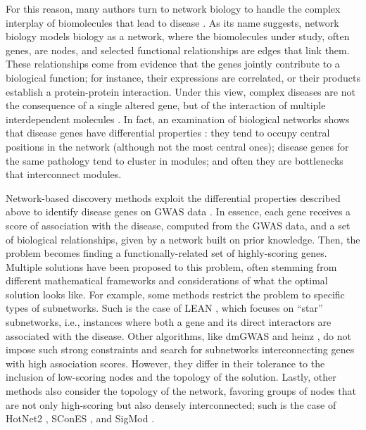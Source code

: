 \documentclass[10pt,letterpaper]{article}
\begin{document}
For this reason, many authors turn to network biology to handle the complex interplay of biomolecules that lead to disease \cite{furlong_human_2013,leisersonNetworkAnalysisGWAS2013}. As its name suggests, network biology models biology as a network, where the biomolecules under study, often genes, are nodes, and selected functional relationships are edges that link them. These relationships come from evidence that the genes jointly contribute to a biological function; for instance, their expressions are correlated, or their products establish a protein-protein interaction. Under this view, complex diseases are not the consequence of a single altered gene, but of the interaction of multiple interdependent molecules \cite{barabasi_network_2011}. In fact, an examination of biological networks shows that disease genes have differential properties \cite{barabasi_network_2011,cai_broker_2010}: they tend to occupy central positions in the network (although not the most central ones); disease genes for the same pathology tend to cluster in modules; and often they are bottlenecks that interconnect modules.

Network-based discovery methods exploit the differential properties described above to identify disease genes on GWAS data \cite{azencott_network-guided_2016,huang_systematic_2018}. In essence, each gene receives a score of association with the disease, computed from the GWAS data, and a set of biological relationships, given by a network built on prior knowledge. Then, the problem becomes finding a functionally-related set of highly-scoring genes. Multiple solutions have been proposed to this problem, often stemming from different mathematical frameworks and considerations of what the optimal solution looks like. For example, some methods restrict the problem to specific types of subnetworks. Such is the case of LEAN \cite{gwinner_network-based_2016}, which focuses on ``star'' subnetworks, i.e., instances where both a gene and its direct interactors are associated with the disease. Other algorithms, like dmGWAS \cite{jia_dmgwas:_2011} and heinz \cite{dittrich_identifying_2008}, do not impose such strong constraints and search for subnetworks interconnecting genes with high association scores. However, they differ in their tolerance to the inclusion of low-scoring nodes and the topology of the solution. Lastly, other methods also consider the topology of the network, favoring groups of nodes that are not only high-scoring but also densely interconnected; such is the case of HotNet2 \cite{leiserson_pan-cancer_2015}, SConES \cite{azencott_efficient_2013}, and SigMod \cite{liu_sigmod:_2017}.
\end{document}
